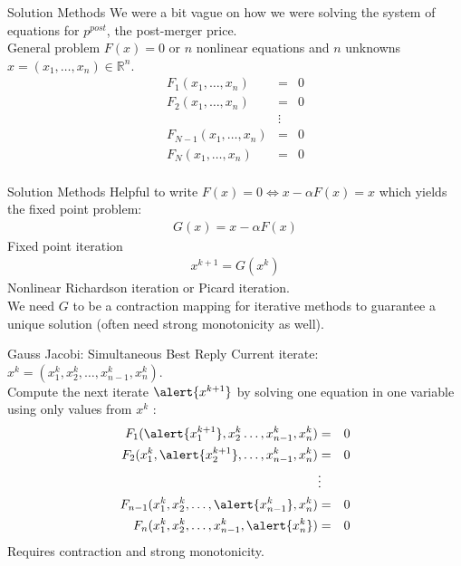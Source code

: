 \documentclass[xcolor=pdftex,dvipsnames,table,mathserif]{beamer}
\begin{document}
\begin{frame}{Solution Methods}
We were a bit vague on how we were solving the system of equations for $p^{post}$, the post-merger price.\\

\vspace{0.5cm}
General problem $F(x) = 0$ or $n$ nonlinear equations and $n$ unknowns $x = (x_1,\ldots, x_n) \in \mathbb{R}^n$.
\begin{eqnarray*}
F_1 (x_1,\ldots, x_n)  &=& 0 \\
F_2 (x_1,\ldots, x_n)  &=& 0\\
&\vdots&\\ 
F_{N-1} (x_1,\ldots, x_n)  &=& 0\\
F_N (x_1,\ldots, x_n)  &=& 0\\
\end{eqnarray*}
\end{frame} 

\begin{frame}{Solution Methods}
Helpful to write $F(x) = 0 \Leftrightarrow x - \alpha F(x) = x$ which yields the fixed point problem:
\begin{eqnarray*}
G(x) = x -\alpha F(x)
\end{eqnarray*}
Fixed point iteration
\begin{eqnarray*}
x^{k+1} = G(x^k)
\end{eqnarray*}
Nonlinear Richardson iteration or Picard iteration.\\
\vspace{0.5cm}
We need $G$ to be a \alert{contraction mapping} for iterative methods to guarantee a unique solution (often need strong monotonicity as well).
\end{frame} 

\begin{frame}{Gauss Jacobi: Simultaneous Best Reply}
Current iterate: $x^k = (x_1^k,x_2^k,\ldots,x_{n-1}^k,x_n^k)$.\\
\vspace{0.5cm}
Compute the next iterate $\alert{x^{k+1}}$ by solving one equation in one variable using only values from $x^k$ : 
\begin{eqnarray*}
F_1 (\alert{x_1^{k+1}},x_2^k \ldots, x_{n-1}^k, x_n^k)  &=& 0 \\
F_2  (x_1^k,\alert{x_2^{k+1}},\ldots,x_{n-1}^k,x_n^k)  &=& 0\\
&\vdots&\\ 
F_{n-1}  (x_1^k,x_2^k,\ldots,\alert{x_{n-1}^k},x_n^k)  &=& 0\\
F_n  (x_1^k,x_2^k,\ldots,x_{n-1}^k, \alert{x_n^k})  &=& 0\\
\end{eqnarray*}
Requires contraction and strong monotonicity.
\end{frame} 
\end{document}
